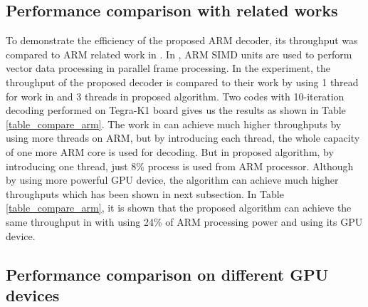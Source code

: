 \documentclass[conference]{IEEEtran}
\begin{document}
\subsection{Performance comparison with related works}
To demonstrate the efficiency of the proposed ARM decoder, its throughput was compared to ARM related work in \cite{art_neon}. In \cite{art_neon}, ARM SIMD units are used to perform vector data processing in parallel frame processing. In the experiment, the throughput of the proposed decoder is compared to their work by using 1 thread for work in \cite{art_neon} and 3 threads in proposed algorithm. Two codes with 10-iteration decoding performed on Tegra-K1 board gives us the results as shown in Table \ref{table_compare_arm}. The work in \cite{art_neon} can achieve much higher throughputs by using more threads on ARM, but by introducing each thread, the whole capacity of one more ARM core is used for decoding. But in proposed algorithm, by introducing one thread, just 8\% process is used from ARM processor. Although by using more powerful GPU device, the algorithm can achieve much higher throughputs which has been shown in next subsection. In Table \ref{table_compare_arm}, it is shown that the proposed algorithm can achieve the same throughput in \cite{art_neon} with using 24\% of ARM processing power and using its GPU device. 
\begin{table}[h]
\centering
\caption{Throughput (Mbps) Comparison With Related Work} \label{table_compare_arm}
\end{table}

\subsection{Performance comparison on different GPU devices}
\end{document}
